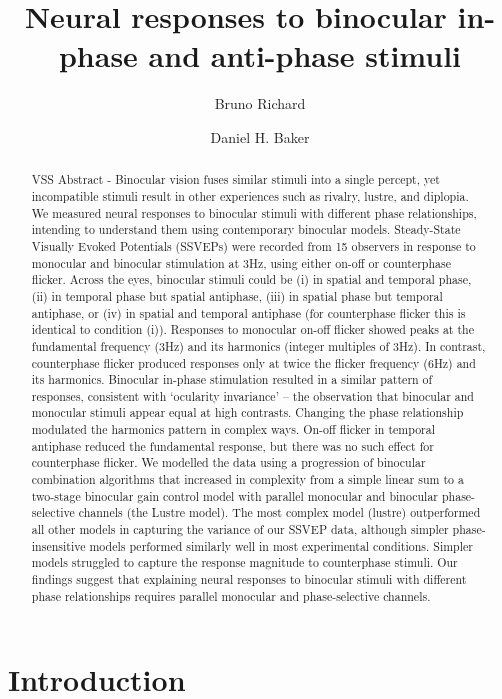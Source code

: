 \documentclass[
  12pt,
]{article}
\title{Neural responses to binocular in-phase and anti-phase stimuli}
\author[1]{Bruno Richard}
\author[2]{Daniel H. Baker}
\affil[1]{Department of Math and Computer Sciences, Rutgers
University, Newark, New Jersey, USA}
\affil[2]{Department of Psychology, University of York, York, UK}
\date{}
\begin{document}
\maketitle
\begin{abstract}
VSS Abstract - Binocular vision fuses similar stimuli into a single
percept, yet incompatible stimuli result in other experiences such as
rivalry, lustre, and diplopia. We measured neural responses to binocular
stimuli with different phase relationships, intending to understand them
using contemporary binocular models. Steady-State Visually Evoked
Potentials (SSVEPs) were recorded from 15 observers in response to
monocular and binocular stimulation at 3Hz, using either on-off or
counterphase flicker. Across the eyes, binocular stimuli could be (i) in
spatial and temporal phase, (ii) in temporal phase but spatial
antiphase, (iii) in spatial phase but temporal antiphase, or (iv) in
spatial and temporal antiphase (for counterphase flicker this is
identical to condition (i)). Responses to monocular on-off flicker
showed peaks at the fundamental frequency (3Hz) and its harmonics
(integer multiples of 3Hz). In contrast, counterphase flicker produced
responses only at twice the flicker frequency (6Hz) and its harmonics.
Binocular in-phase stimulation resulted in a similar pattern of
responses, consistent with `ocularity invariance' -- the observation
that binocular and monocular stimuli appear equal at high contrasts.
Changing the phase relationship modulated the harmonics pattern in
complex ways. On-off flicker in temporal antiphase reduced the
fundamental response, but there was no such effect for counterphase
flicker. We modelled the data using a progression of binocular
combination algorithms that increased in complexity from a simple linear
sum to a two-stage binocular gain control model with parallel monocular
and binocular phase-selective channels (the Lustre model). The most
complex model (lustre) outperformed all other models in capturing the
variance of our SSVEP data, although simpler phase-insensitive models
performed similarly well in most experimental conditions. Simpler models
struggled to capture the response magnitude to counterphase stimuli. Our
findings suggest that explaining neural responses to binocular stimuli
with different phase relationships requires parallel monocular and
phase-selective channels.
\end{abstract}


\section{Introduction}\label{introduction}
\end{document}
